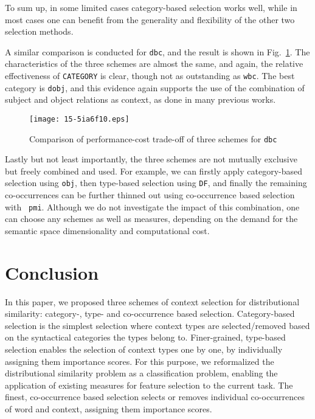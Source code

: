 \documentclass[english]{jnlp_1.4}
\begin{document}
To sum up, in some limited cases category-based selection works well,
while in most cases one can benefit from the generality and
flexibility of the other two selection methods.


A similar comparison is conducted for {\tt dbc}, and the result is
shown in Fig.~\ref{fig_cocrres2_dbc}. The characteristics of the three
schemes are almost the same, and again, the relative effectiveness of
{\tt CATEGORY} is clear, though not as outstanding as {\tt wbc}.  The
best category is {\tt dobj}, and this evidence again supports the use
of the combination of subject and object relations as context, as done
in many previous works.

\begin{figure}[b]
\begin{center}
\texttt{[image: 15-5ia6f10.eps]}
\end{center}
\caption{Comparison of performance-cost trade-off of three schemes for {\tt dbc}}
\label{fig_cocrres2_dbc}
\end{figure}

Lastly but not least importantly, the three schemes are not mutually
exclusive but freely combined and used. For example, we can firstly
apply category-based selection using {\tt obj}, then type-based
selection using {\tt DF}, and finally the remaining co-occurrences can
be further thinned out using co-occurrence based selection with {\tt
pmi}. Although we do not investigate the impact of this combination,
one can choose any schemes as well as measures, depending on the
demand for the semantic space dimensionality and computational cost.

\section{Conclusion}


In this paper, we proposed three schemes of context selection for
distributional similarity: category-, type- and co-occurrence based
selection. Category-based selection is the simplest selection where
context types are selected/removed based on the syntactical categories
the types belong to. Finer-grained, type-based selection enables the
selection of context types one by one, by individually assigning them
importance scores. For this purpose, we reformalized the
distributional similarity problem as a classification problem,
enabling the application of existing measures for feature selection to
the current task. The finest, co-occurrence based selection selects or
removes individual co-occurrences of word and context, assigning them
importance scores.
\end{document}
